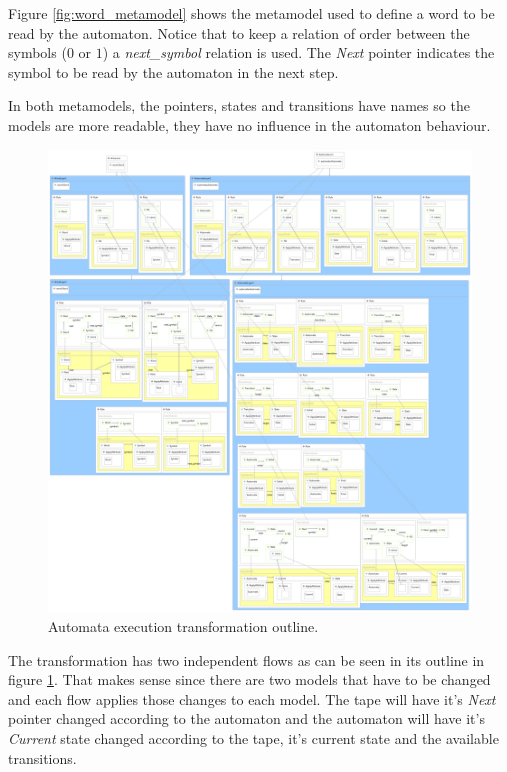 Figure \ref{fig:word_metamodel} shows the metamodel used to define a word to be read by the automaton. Notice that to keep a relation of order between the symbols ($0$ or $1$) a \emph{next\_symbol} relation is used. The \emph{Next} pointer indicates the symbol to be read by the automaton in the next step.

In both metamodels, the pointers, states and transitions have names so the models are more readable, they have no influence in the automaton behaviour.

\begin{figure}[h]
\begin{center}
  \includegraphics[width=\textwidth]{imgs/ExecuteAutomataTransformationOutline.png}
  \caption{Automata execution transformation outline.}
  \label{fig:ExecuteAutomataTransformationOutline}
\end{center}
\end{figure}

The transformation has two independent flows as can be seen in its outline in figure \ref{fig:ExecuteAutomataTransformationOutline}. That makes sense since there are two models that have to be changed and each flow applies those changes to each model. The tape will have it's \emph{Next} pointer changed according to the automaton and the automaton will have it's \emph{Current} state changed according to the tape, it's current state and the available transitions.


